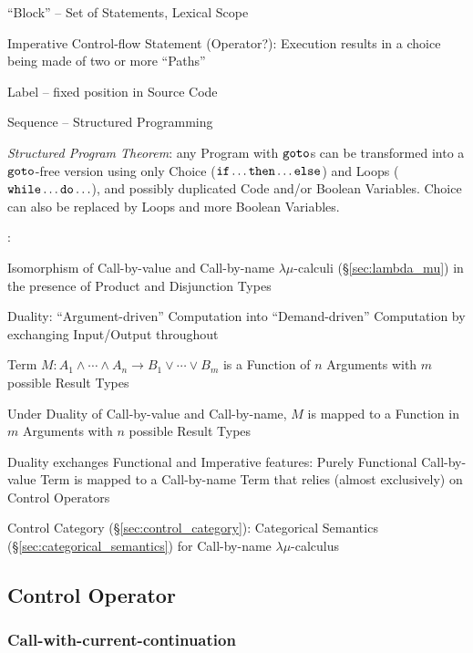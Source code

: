 ``Block'' -- Set of Statements, Lexical Scope %

Imperative Control-flow Statement (Operator?): Execution results in a
choice being made of two or more ``Paths''

Label -- fixed position in Source Code

Sequence -- Structured Programming

\emph{Structured Program Theorem}: any Program with $\mathtt{goto}$s can
be transformed into a $\mathtt{goto}$-free version using only Choice
($\mathtt{if}\ldots\mathtt{then}\ldots\mathtt{else}$) and Loops
($\mathtt{while}\ldots\mathtt{do}\ldots$), and possibly duplicated Code
and/or Boolean Variables. Choice can also be replaced by Loops and
more Boolean Variables.


\asterism


\cite{selinger01}:

Isomorphism of Call-by-value and Call-by-name $\lambda\mu$-calculi
(\S\ref{sec:lambda_mu}) in the presence of Product and Disjunction
Types

Duality: ``Argument-driven'' Computation into ``Demand-driven''
Computation by exchanging Input/Output throughout

Term $M : A_1 \wedge \cdots \wedge A_n \rightarrow B_1 \vee \cdots
\vee B_m$ is a Function of $n$ Arguments with $m$ possible Result
Types

Under Duality of Call-by-value and Call-by-name, $M$ is mapped to a
Function in $m$ Arguments with $n$ possible Result Types

Duality exchanges Functional and Imperative features: Purely
Functional Call-by-value Term is mapped to a Call-by-name Term that
relies (almost exclusively) on Control Operators %

Control Category (\S\ref{sec:control_category}): Categorical Semantics
(\S\ref{sec:categorical_semantics}) for Call-by-name
$\lambda\mu$-calculus



\subsection{Control Operator}\label{sec:control_operator}

\subsubsection{Call-with-current-continuation}\label{sec:callcc}

